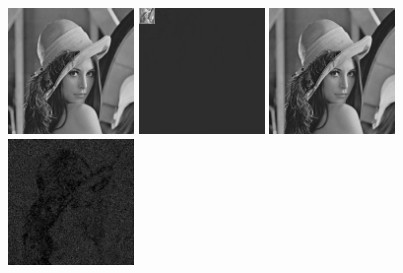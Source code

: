 \documentclass{article}
\begin{document}
\includegraphics[width=0.25\textwidth]{../data/lenna.jpg}
\includegraphics[width=0.25\textwidth]{../data/daubechies_transform_lenna.jpg}
\includegraphics[width=0.25\textwidth]{../data/daubechies_lenna.jpg}
\includegraphics[width=0.25\textwidth]{../data/delta_daubechies_lenna.jpg}
\end{document}

